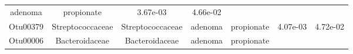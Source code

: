 \documentclass[11pt,]{article}
\begin{document}
\begin{longtable}[]{@{}ccccccc@{}}
\begin{minipage}[t]{0.09\columnwidth}
adenoma\strut
\end{minipage} & \begin{minipage}[t]{0.11\columnwidth}\centering\strut
propionate\strut
\end{minipage} & \begin{minipage}[t]{0.09\columnwidth}\centering\strut
3.67e-03\strut
\end{minipage} & \begin{minipage}[t]{0.09\columnwidth}\centering\strut
4.66e-02\strut
\end{minipage}\tabularnewline
\begin{minipage}[t]{0.09\columnwidth}\centering\strut
Otu00379\strut
\end{minipage} & \begin{minipage}[t]{0.17\columnwidth}\centering\strut
Streptococcaceae\strut
\end{minipage} & \begin{minipage}[t]{0.17\columnwidth}\centering\strut
Streptococcaceae\strut
\end{minipage} & \begin{minipage}[t]{0.09\columnwidth}\centering\strut
adenoma\strut
\end{minipage} & \begin{minipage}[t]{0.11\columnwidth}\centering\strut
propionate\strut
\end{minipage} & \begin{minipage}[t]{0.09\columnwidth}\centering\strut
4.07e-03\strut
\end{minipage} & \begin{minipage}[t]{0.09\columnwidth}\centering\strut
4.72e-02\strut
\end{minipage}\tabularnewline
\begin{minipage}[t]{0.09\columnwidth}\centering\strut
Otu00006\strut
\end{minipage} & \begin{minipage}[t]{0.17\columnwidth}\centering\strut
Bacteroidaceae\strut
\end{minipage} & \begin{minipage}[t]{0.17\columnwidth}\centering\strut
Bacteroidaceae\strut
\end{minipage} & \begin{minipage}[t]{0.09\columnwidth}\centering\strut
adenoma\strut
\end{minipage} & \begin{minipage}[t]{0.11\columnwidth}\centering\strut
propionate\strut
\end{minipage} & \begin{minipage}[t]{0.09\columnwidth}\centering\strut

\end{minipage}
\end{longtable}
\end{document}
